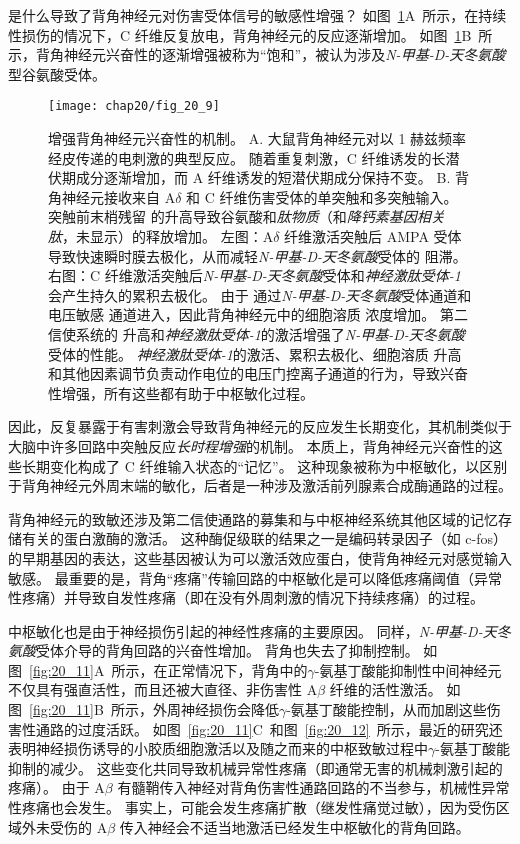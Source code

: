 是什么导致了背角神经元对伤害受体信号的敏感性增强？
如图~\ref{fig:20_10}A~所示，在持续性损伤的情况下，C 纤维反复放电，背角神经元的反应逐渐增加。
如图~\ref{fig:20_10}B~所示，背角神经元兴奋性的逐渐增强被称为“饱和”，被认为涉及\textit{N-甲基-D-天冬氨酸}型谷氨酸受体。


\begin{figure}[htbp]
	\centering
	\texttt{[image: chap20/fig\_20\_9]}
	\caption{增强背角神经元兴奋性的机制。
		A. 大鼠背角神经元对以 1 赫兹频率经皮传递的电刺激的典型反应。
		随着重复刺激，C 纤维诱发的长潜伏期成分逐渐增加，而 A 纤维诱发的短潜伏期成分保持不变。
		B. 背角神经元接收来自 A$\delta$ 和 C 纤维伤害受体的单突触和多突触输入。
		突触前末梢残留  的升高导致谷氨酸和\textit{肽物质}（和\textit{降钙素基因相关肽}，未显示）的释放增加。
		左图：A$\delta$ 纤维激活突触后 AMPA 受体导致快速瞬时膜去极化，从而减轻\textit{N-甲基-D-天冬氨酸}受体的  阻滞。
		右图：C 纤维激活突触后\textit{N-甲基-D-天冬氨酸}受体和\textit{神经激肽受体-1}会产生持久的累积去极化。
		由于  通过\textit{N-甲基-D-天冬氨酸}受体通道和电压敏感  通道进入，因此背角神经元中的细胞溶质  浓度增加。
		第二信使系统的  升高和\textit{神经激肽受体-1}的激活增强了\textit{N-甲基-D-天冬氨酸}受体的性能。
		\textit{神经激肽受体-1}的激活、累积去极化、细胞溶质  升高和其他因素调节负责动作电位的电压门控离子通道的行为，导致兴奋性增强，所有这些都有助于中枢敏化过程。}
	\label{fig:20_10}
\end{figure}


因此，反复暴露于有害刺激会导致背角神经元的反应发生长期变化，其机制类似于大脑中许多回路中突触反应\textit{长时程增强}的机制。
本质上，背角神经元兴奋性的这些长期变化构成了 C 纤维输入状态的“记忆”。
这种现象被称为中枢敏化，以区别于背角神经元外周末端的敏化，后者是一种涉及激活前列腺素合成酶通路的过程。


背角神经元的致敏还涉及第二信使通路的募集和与中枢神经系统其他区域的记忆存储有关的蛋白激酶的激活。
这种酶促级联的结果之一是编码转录因子（如 c-fos）的早期基因的表达，这些基因被认为可以激活效应蛋白，使背角神经元对感觉输入敏感。
最重要的是，背角“疼痛”传输回路的中枢敏化是可以降低疼痛阈值（异常性疼痛）并导致自发性疼痛（即在没有外周刺激的情况下持续疼痛）的过程。


中枢敏化也是由于神经损伤引起的神经性疼痛的主要原因。
同样，\textit{N-甲基-D-天冬氨酸}受体介导的背角回路的兴奋性增加。
背角也失去了抑制控制。
如图~\ref{fig:20_11}A~所示，在正常情况下，背角中的$\gamma$-氨基丁酸能抑制性中间神经元不仅具有强直活性，而且还被大直径、非伤害性 A$ \beta $ 纤维的活性激活。
如图~\ref{fig:20_11}B~所示，外周神经损伤会降低$\gamma$-氨基丁酸能控制，从而加剧这些伤害性通路的过度活跃。
如图~\ref{fig:20_11}C~和图~\ref{fig:20_12}~所示，最近的研究还表明神经损伤诱导的小胶质细胞激活以及随之而来的中枢致敏过程中$\gamma$-氨基丁酸能抑制的减少。
这些变化共同导致机械异常性疼痛（即通常无害的机械刺激引起的疼痛）。
由于 A$ \beta $ 有髓鞘传入神经对背角伤害性通路回路的不当参与，机械性异常性疼痛也会发生。
事实上，可能会发生疼痛扩散（继发性痛觉过敏），因为受伤区域外未受伤的 A$ \beta $ 传入神经会不适当地激活已经发生中枢敏化的背角回路。


